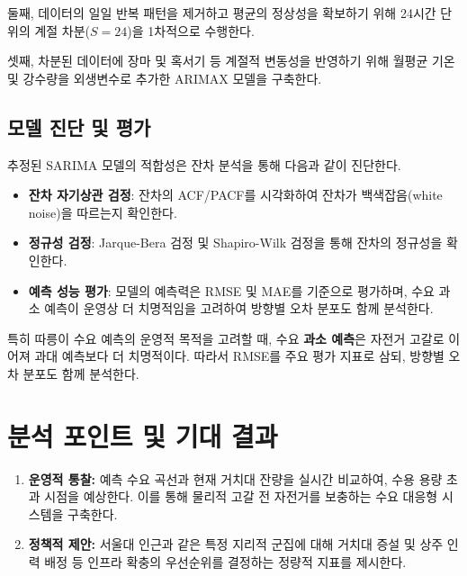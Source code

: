 \documentclass[11pt, a4paper]{article}
\begin{document}
둘째, 데이터의 일일 반복 패턴을 제거하고 평균의 정상성을 확보하기 위해 24시간 단위의 계절 차분($S=24$)을 1차적으로 수행한다.

셋째, 차분된 데이터에 장마 및 혹서기 등 계절적 변동성을 반영하기 위해 월평균 기온 및 강수량을 외생변수로 추가한 ARIMAX 모델을 구축한다.

    \subsection{모델 진단 및 평가}

추정된 SARIMA 모델의 적합성은 잔차 분석을 통해 다음과 같이 진단한다.

\begin{itemize}
    \item \textbf{잔차 자기상관 검정}: 잔차의 ACF/PACF를 시각화하여 
    잔차가 백색잡음(white noise)을 따르는지 확인한다.
    
    \item \textbf{정규성 검정}: Jarque-Bera 검정 및 Shapiro-Wilk 검정을 
    통해 잔차의 정규성을 확인한다.
    
    \item \textbf{예측 성능 평가}: 모델의 예측력은 RMSE 및 MAE를 기준으로 
    평가하며, 수요 과소 예측이 운영상 더 치명적임을 고려하여 방향별 오차 
    분포도 함께 분석한다.
\end{itemize}

특히 따릉이 수요 예측의 운영적 목적을 고려할 때, 수요 \textbf{과소 예측}은 자전거 고갈로 이어져 과대 예측보다 더 치명적이다. 따라서 RMSE를 주요 평가 지표로 삼되, 방향별 오차 분포도 함께 분석한다.

	
	\section{분석 포인트 및 기대 결과}
	\begin{enumerate}
		\item \textbf{운영적 통찰:} 예측 수요 곡선과 현재 거치대 잔량을 실시간 비교하여, 수용 용량 초과 시점을 예상한다. 이를 통해 물리적 고갈 전 자전거를 보충하는 수요 대응형 시스템을 구축한다.
		\item \textbf{정책적 제안:} 서울대 인근과 같은 특정 지리적 군집에 대해 거치대 증설 및 상주 인력 배정 등 인프라 확충의 우선순위를 결정하는 정량적 지표를 제시한다.
	\end{enumerate}
	
\end{document}
